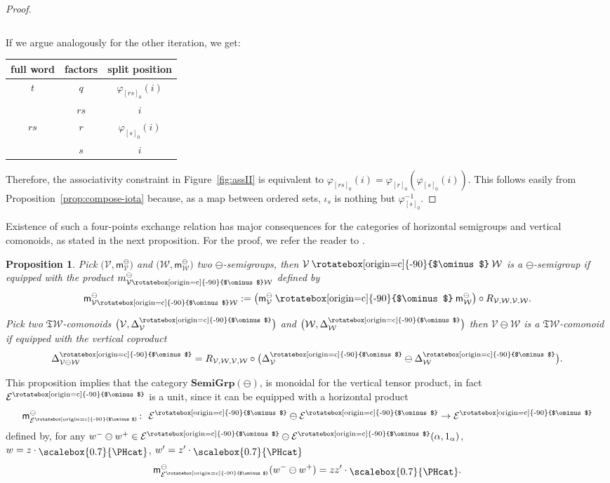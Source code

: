 \documentclass[pdftex]{sigma}
\newcommand\overt{\mathbin{\text{\rotatebox[origin=c]{-90}{$\ominus$}}}}
\def\uvert{{\mathcal{E}}^{\overt}}
\newcommand{\SWc}{{\mathfrak{T}\mathcal{W}}}
\newcommand{\vcp}{\Delta^{\overt}}
\newcommand\hp{\mathsf{m}^{\ominus}}
\newcommand\CAT[1]{\mathbf{#1}}
\newcommand\sgominus{\CAT{SemiGrp}(\ominus)}
\newcommand{\Singleton}{\raisebox{-2pt}{\scalebox{0.7}{\PHcat}}}
\numberwithin{equation}{section}
\newtheorem{Proposition}[Theorem]{Proposition}
\begin{document}
\begin{proof}
\begin{center}
\begin{tabular}{|c|c|c|}
 \end{tabular}
 \end{center}
 If we argue analogously for the other iteration, we get:
 \begin{center}
 \begin{tabular}{|c|c|c|}\hline
 full word& factors & split position\\\hline\hline
 \multirow{2}{*}{$t$}&$q$&$\varphi_{[rs]_0}(i)$\\\cline{2-3}
 &$rs$&$i$\\\hline\hline
 \multirow{2}{*}{$rs$}&$r$&$\varphi_{[s]_0}(i)$\\\cline{2-3}
 &$s$&$i$\\\hline

 \end{tabular}
 \end{center}
 Therefore, the associativity constraint in Figure~\ref{fig:assII} is equivalent to $\varphi_{[rs]_0}(i)=\varphi_{[r]_0}(\varphi_{[s]_0}(i))$. This follows easily from Proposition~\ref{prop:compose-iota} because, as a map between ordered sets, $\iota_s$ is nothing but $\varphi_{[s]_0}^{-1}$.
\end{proof}

 Existence of such a four-points exchange relation has major consequences for the categories of horizontal semigroups and vertical comonoids, as stated in the next proposition. For the proof, we refer the reader to \cite[Chapter 4]{aguiar2010monoidal}.

\begin{Proposition}	\label{prop:duoid}
	Pick $\big(\mathcal{V},\hp_\mathcal{V}\big)$ and $\big(\mathcal{W},\hp_\mathcal{W}\big)$ two $\ominus$-semigroups, then $\mathcal{V}\overt \mathcal{W}$ is a $\ominus$-semigroup if equipped with the product $m_{\mathcal{V}\overt \mathcal{W}}^{\ominus}$ defined by
	\begin{equation}\label{eqn:exchange-m^ominus}
		\hp_{\mathcal{V}\overt \mathcal{W}} := \big(\hp_{\mathcal{V}} \overt \hp_{\mathcal{W}}\big) \circ R_{\mathcal{V},\mathcal{W},\mathcal{V},\mathcal{W}}.
	\end{equation}

	Pick two $\SWc$-comonoids $\big(\mathcal{V},\vcp_{\mathcal{V}}\big)$ and $\big(\mathcal{W},\vcp_\mathcal{W}\big)$ then $\mathcal{V}\ominus \mathcal{W}$ is a $\SWc$-comonoid if equipped with the vertical coproduct
	\begin{equation*}
		\vcp_{\mathcal{V}\ominus \mathcal{W}} = R_{\mathcal{V},\mathcal{W},\mathcal{V},\mathcal{W}} \circ \big(\vcp_\mathcal{V} \ominus \vcp_\mathcal{W}\big).
	\end{equation*}
\end{Proposition}
This proposition implies that the category $\sgominus$,
is monoidal for the vertical tensor product, in fact $\uvert$ is a unit, since it can be equipped with a horizontal product
 \[
 \hp_{\uvert}\colon \ \uvert \ominus \uvert \to \uvert
 \]
 defined by, for any $w^{-}\ominus w^{+} \in \uvert \ominus \uvert (\alpha, 1_{\alpha}) $, $w=z\cdot \Singleton$, $w^{\prime} = z^{\prime}\cdot \Singleton$
 \[
 \hp_{\uvert}(w^{-}\ominus w^{+}) = zz^{\prime} \cdot \Singleton.
 \]
\end{document}

